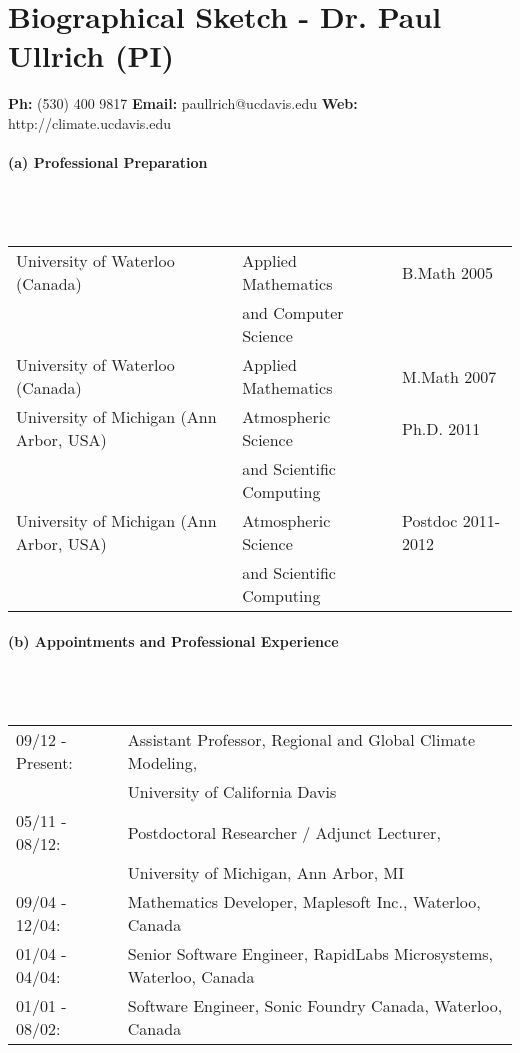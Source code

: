 \documentclass[11pt]{article}
\begin{document}
\setcounter{section}{3}

\section{\textbf{Biographical Sketch - Dr. Paul Ullrich (PI)}}
\begin{center}
\textbf{Ph:} (530) 400 9817
\textbf{Email:} paullrich@ucdavis.edu
\textbf{Web:} http://climate.ucdavis.edu
\end{center}
\vspace{-0.8cm}
\paragraph{\large (a) Professional Preparation}\ \\ \ \\
\vspace{-0.8cm}
\begin{tabular*}{\textwidth}{@{\extracolsep{\fill}}lll}
University of Waterloo (Canada) & Applied Mathematics & B.Math 2005 \\
& \qquad and Computer Science & \\
University of Waterloo (Canada) & Applied Mathematics & M.Math 2007 \\
University of Michigan (Ann Arbor, USA) & Atmospheric Science & Ph.D. 2011 \\
& \qquad and Scientific Computing & \\
University of Michigan (Ann Arbor, USA) & Atmospheric Science & Postdoc 2011-2012 \\
& \qquad and Scientific Computing & \\
\end{tabular*}

\vspace{0.8cm}
\paragraph{\large (b) Appointments and Professional Experience}\ \\ \ \\
\vspace{-0.8cm}
\begin{tabular*}{\textwidth}{@{\extracolsep{\fill}}ll}
09/12 - Present: & Assistant Professor, Regional and Global Climate Modeling, \\
& \qquad University of California Davis \\
05/11 - 08/12: & Postdoctoral Researcher / Adjunct Lecturer, \\
& \qquad University of Michigan, Ann Arbor, MI \\
09/04 - 12/04: & Mathematics Developer, Maplesoft Inc., Waterloo, Canada \\
01/04 - 04/04: & Senior Software Engineer, RapidLabs Microsystems, Waterloo, Canada \\
01/01 - 08/02: & Software Engineer, Sonic Foundry Canada, Waterloo, Canada
\end{tabular*}
\end{document}
